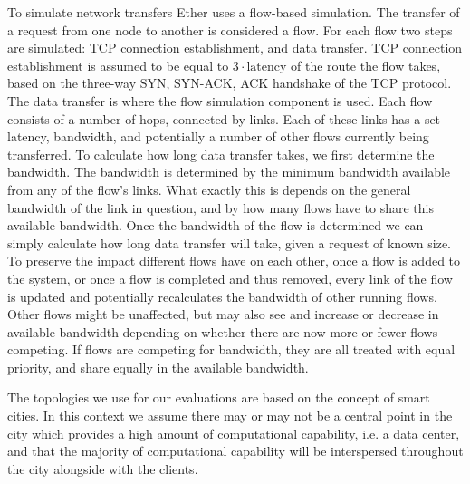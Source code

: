 To simulate network transfers Ether uses a flow-based simulation.
The transfer of a request from one node to another is considered a flow.
For each flow two steps are simulated: TCP connection establishment, and data transfer.
TCP connection establishment is assumed to be equal to $ 3 \cdot \text{latency}$ of the route the flow takes, based on the three-way SYN, SYN-ACK, ACK handshake of the TCP protocol.\\
The data transfer is where the flow simulation component is used.
Each flow consists of a number of hops, connected by links.
Each of these links has a set latency, bandwidth, and potentially a number of other flows currently being transferred.
To calculate how long data transfer takes, we first determine the bandwidth.
The bandwidth is determined by the minimum bandwidth available from any of the flow's links.
What exactly this is depends on the general bandwidth of the link in question, and by how many flows have to share this available bandwidth.
Once the bandwidth of the flow is determined we can simply calculate how long data transfer will take, given a request of known size.
To preserve the impact different flows have on each other, once a flow is added to the system, or once a flow is completed and thus removed, every link of the flow is updated and potentially recalculates the bandwidth of other running flows.
Other flows might be unaffected, but may also see and increase or decrease in available bandwidth depending on whether there are now more or fewer flows competing.
If flows are competing for bandwidth, they are all treated with equal priority, and share equally in the available bandwidth.


The topologies we use for our evaluations are based on the concept of smart cities\cite{suSmartCityApplications2011}.
In this context we assume there may or may not be a central point in the city which provides a high amount of computational capability, i.e. a data center, and that the majority of computational capability will be interspersed throughout the city alongside with the clients.

